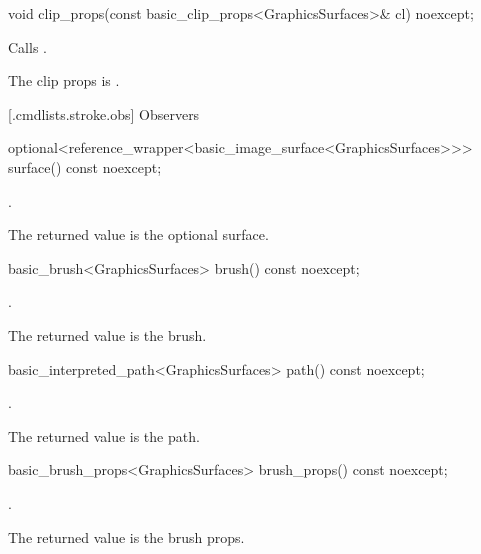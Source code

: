 %
\begin{itemdecl}
void clip_props(const basic_clip_props<GraphicsSurfaces>& cl) noexcept;
\end{itemdecl}
\begin{itemdescr}
\pnum
\effects Calls .

\pnum
\remarks The clip props is .
\end{itemdescr}

 [\iotwod.cmdlists.stroke.obs] {Observers}%

%
\begin{itemdecl}
optional<reference_wrapper<basic_image_surface<GraphicsSurfaces>>> 
  surface() const noexcept;
\end{itemdecl}
\begin{itemdescr}
\pnum
\returns {}.

\pnum
\remarks
The returned value is the optional surface.
\end{itemdescr}

%
\begin{itemdecl}
basic_brush<GraphicsSurfaces> brush() const noexcept;
\end{itemdecl}
\begin{itemdescr}
\pnum
\returns {}.

\pnum
\remarks The returned value is the brush.
\end{itemdescr}

%
\begin{itemdecl}
basic_interpreted_path<GraphicsSurfaces> path() const noexcept;
\end{itemdecl}
\begin{itemdescr}
\pnum
\returns {}.

\pnum
\remarks The returned value is the path.
\end{itemdescr}

%
\begin{itemdecl}
basic_brush_props<GraphicsSurfaces> brush_props() const noexcept;
\end{itemdecl}
\begin{itemdescr}
\pnum
\returns {}.

\pnum
\remarks The returned value is the brush props.
\end{itemdescr}

